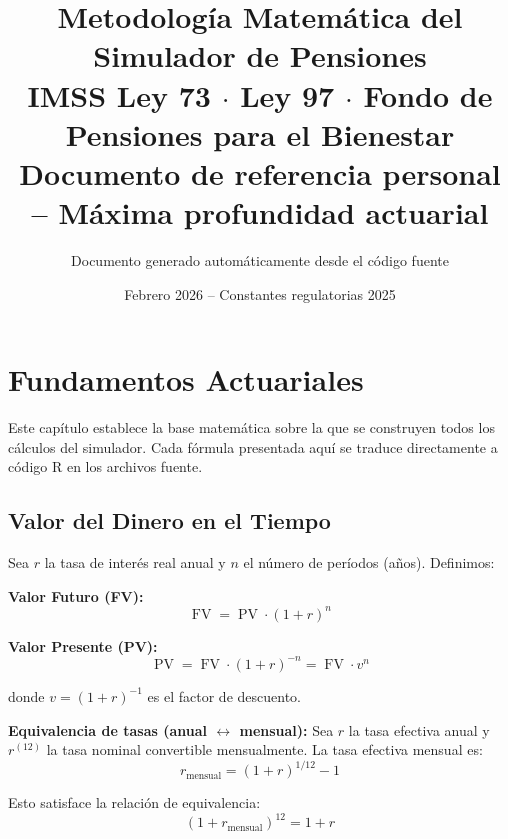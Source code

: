 \documentclass[11pt,a4paper]{report}
\title{
  \vspace{-2cm}
  \textbf{Metodolog\'ia Matem\'atica del\\Simulador de Pensiones}\\[0.5cm]
  \large IMSS Ley 73 $\cdot$ Ley 97 $\cdot$ Fondo de Pensiones para el Bienestar\\[0.3cm]
  \normalsize Documento de referencia personal -- M\'axima profundidad actuarial
}
\author{Documento generado autom\'aticamente desde el c\'odigo fuente}
\date{Febrero 2026 -- Constantes regulatorias 2025}
\theoremstyle{remark}
\DeclareMathOperator{\FV}{FV}
\DeclareMathOperator{\PV}{PV}
\begin{document}
\maketitle
\tableofcontents
\newpage

\chapter{Fundamentos Actuariales}

Este cap\'itulo establece la base matem\'atica sobre la que se construyen todos los c\'alculos del simulador. Cada f\'ormula presentada aqu\'i se traduce directamente a c\'odigo R en los archivos fuente.

\section{Valor del Dinero en el Tiempo}

\begin{tcolorbox}[colback=blue!5!white, colframe=blue!75!black, title=\textbf{Definici\'on Formal}]
Sea $r$ la tasa de inter\'es real anual y $n$ el n\'umero de per\'iodos (a\~nos). Definimos:

\textbf{Valor Futuro (FV):}
\begin{equation}
\FV = \PV \cdot (1 + r)^n
\label{eq:fv_basic}
\end{equation}

\textbf{Valor Presente (PV):}
\begin{equation}
\PV = \FV \cdot (1 + r)^{-n} = \FV \cdot v^n
\end{equation}

donde $v = (1 + r)^{-1}$ es el factor de descuento.

\textbf{Equivalencia de tasas (anual $\leftrightarrow$ mensual):}
Sea $r$ la tasa efectiva anual y $r^{(12)}$ la tasa nominal convertible mensualmente. La tasa efectiva mensual es:
\begin{equation}
r_{\text{mensual}} = (1 + r)^{1/12} - 1
\label{eq:r_mensual}
\end{equation}

Esto satisface la relaci\'on de equivalencia:
\begin{equation}
(1 + r_{\text{mensual}})^{12} = 1 + r
\end{equation}
\end{tcolorbox}
\end{document}
